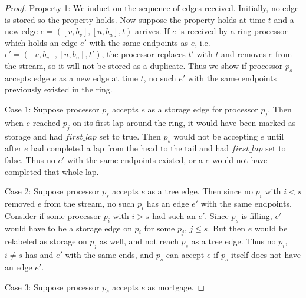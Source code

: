 \begin{proof}
Property 1: We induct on the sequence of edges received. Initially, no edge is stored so the property holds. Now suppose the property holds at time $t$ and a new edge $e = ([v,b_v],[u,b_u],t)$
arrives. If $e$ is received by a ring processor which holds an edge $e'$ with the same endpoints as $e$, i.e. $e' = ([v,b_v],[u,b_u],t')$, the processor replaces $t'$ with $t$ and removes $e$ from the stream, so it will not be stored as a duplicate. Thus we show if processor $p_s$ accepts edge $e$ as a new edge at time $t$, no such $e'$ with the same endpoints previously existed in the ring.

Case 1: Suppose processor $p_s$ accepts $e$ as a storage edge for processor $p_j$. Then when $e$ reached $p_j$ on its first lap around the ring, it would have been marked as storage and had $first\_lap$ set to true. Then $p_s$ would not be accepting $e$ until after $e$ had completed a lap from the head to the tail and had $first\_lap$ set to false. Thus no $e'$ with the same endpoints existed, or a $e$ would not have completed that whole lap.

Case 2: Suppose processor $p_s$ accepts $e$ as a tree edge. Then since no $p_i$ with $i<s$ removed $e$ from the stream, no such $p_i$ has an edge $e'$ with the same endpoints. Consider if some processor $p_i$ with $i>s$ had such an $e'$. Since $p_s$ is filling, $e'$ would have to be a storage edge on $p_i$ for some $p_j$, $j\leq s$. But then $e$ would be relabeled as storage on $p_j$ as well, and not reach $p_s$ as a tree edge. Thus no $p_i$, $i\neq s$ has and $e'$ with the same ends, and $p_s$ can accept $e$ if $p_s$ itself does not have an edge $e'$.

Case 3: Suppose processor $p_s$ accepts $e$ as mortgage.
\end{proof}






